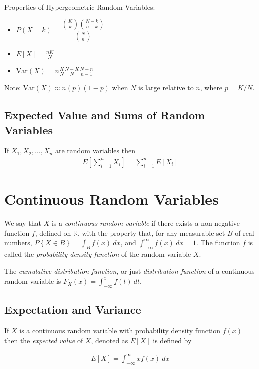 \documentclass[10pt]{article}
\theoremstyle{definition}
\theoremstyle{theorem}
\begin{document}
			Properties of Hypergeometric Random Variables:
		\begin{multicols}{3}
			\begin{itemize}
				\item $P(X=k) = \dfrac{{K \choose k} {{N-k} \choose {n-k}}}{{N \choose n}}$
				\item $E[X] = \frac{nK}{N}$
				\item $\text{Var}(X)= n \frac{K}{N} \frac{N-K}{N} \frac{N-n}{n-1}$
			\end{itemize}
		\end{multicols}
		Note: $\text{Var}(X) \approx n(p)(1-p)$ when $N$ is large relative to $n$, where $p=K/N$.
		
		\subsection*{Expected Value and Sums of Random Variables}
		If $X_1, X_2, \ldots, X_n$ are random variables then
		\begin{align*}
			E \left[ \sum_{i=1}^{n} X_i \right] = \sum_{i=1}^{n} E[X_i]
		\end{align*}
		
		\newpage
		
		\section{Continuous Random Variables}
		We say that $X$ is a \emph{continuous random variable} if there exists a non-negative function $f$, defined on $\mathbb{R}$, with the property that, for any measurable set $B$ of real numbers, $P\left\{ X \in B \right\} = \int_{B} f(x)\: dx$, and $\int_{-\infty}^{\infty}f(x)\:dx = 1$. The function $f$ is called the \emph{probability density function} of the random variable $X$.
		
		The \emph{cumulative distribution function}, or just \emph{distribution function} of a continuous random variable is $F_X(x) = \int_{-\infty}^{x}f(t)\: dt$.
		
		\subsection*{Expectation and Variance}
		If $X$ is a continuous random variable with probability density function $f(x)$ then the \emph{expected value} of $X$, denoted as $E[X]$ is defined by
		
		\begin{align*}
			E[X] = \int_{-\infty}^{\infty} xf(x)\:dx
		\end{align*}
		
\end{document}
